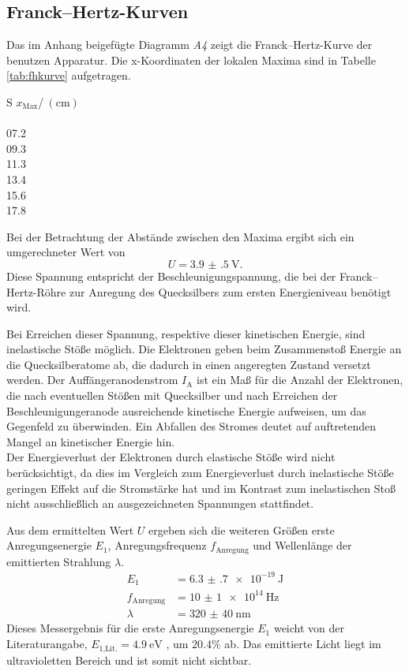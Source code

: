 \subsection{Franck--Hertz-Kurven} %
\label{sec:fhk}
Das im Anhang beigefügte Diagramm \emph{A4} zeigt die Franck--Hertz-Kurve der benutzen Apparatur.
Die x-Koordinaten der lokalen Maxima sind in Tabelle \ref{tab:fhkurve} aufgetragen.
\begin{table}
	\centering
		\begin{tabular}{S}
		\toprule
		{$x_\text{Max}$/$\:(\si{\centi\meter})$}\\
		\\
			07.2\\
			09.3\\
			11.3\\
			13.4\\
			15.6\\
			17.8
		\end{tabular}
	\caption{x-Koordinaten der Maxima der Franck--Hertz-Kurve, ausgelesen aus Appendix \emph{A4}.}
	\label{tab:fhkurve}
\end{table}
Bei der Betrachtung der Abstände zwischen den Maxima ergibt sich ein umgerechneter Wert von
\begin{equation}
	U=\SI{3.9(5)}{\volt}.
\end{equation}
Diese Spannung entspricht der Beschleunigungspannung, die bei der Franck--Hertz-Röhre zur Anregung des Quecksilbers zum ersten Energieniveau benötigt wird.

Bei Erreichen dieser Spannung, respektive dieser kinetischen Energie, sind inelastische Stöße möglich. Die Elektronen geben beim Zusammenstoß Energie an die Quecksilberatome ab, die dadurch in einen angeregten Zustand versetzt werden.
Der Auffängeranodenstrom $I_\mathup{A}$ ist ein Maß für die Anzahl der Elektronen, die nach eventuellen Stößen mit Quecksilber und nach Erreichen der Beschleunigungeranode ausreichende kinetische Energie aufweisen, um das Gegenfeld zu überwinden.
Ein Abfallen des Stromes deutet auf auftretenden Mangel an kinetischer Energie hin.\\
Der Energieverlust der Elektronen durch elastische Stöße wird nicht berücksichtigt, da dies im Vergleich zum Energieverlust durch inelastische Stöße geringen Effekt auf die Stromstärke hat und im Kontrast zum inelastischen Stoß nicht ausschließlich an ausgezeichneten Spannungen stattfindet.

Aus dem ermittelten Wert $U$ ergeben sich die weiteren Größen erste Anregungsenergie $E_1$, Anregungsfrequenz $f_\text{Anregung}$ und Wellenlänge der emittierten Strahlung $\lambda$.
\begin{align}	
	E_1		&=\SI{6.3(7)e-19}{\joule}\\
	f_\text{Anregung}	&=\SI{10(1)e+14}{\hertz}\\
	\lambda				&=\SI{320(40)}{\nano\meter}
\end{align}
Dieses Messergebnis für die erste Anregungsenergie $E_1$ weicht von der Literaturangabe, $E_{1\text{,Lit.}}=\SI{4.9}{\electronvolt}$ \cite{IonEx}, um $20.4\%$ ab.
Das emittierte Licht liegt im ultravioletten Bereich und ist somit nicht sichtbar.

